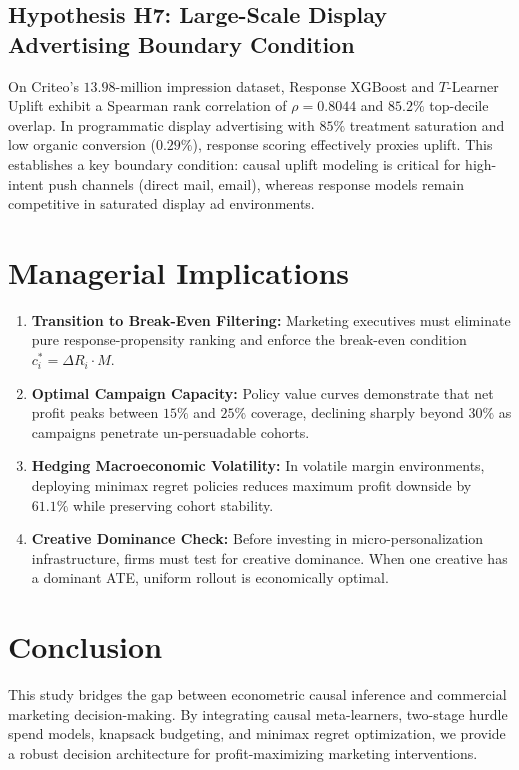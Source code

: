 \documentclass[11pt,a4paper]{article}
\begin{document}
\subsection{Hypothesis H7: Large-Scale Display Advertising Boundary Condition}
On Criteo's $13.98$-million impression dataset, Response XGBoost and $T$-Learner Uplift exhibit a Spearman rank correlation of $\rho = 0.8044$ and $85.2\%$ top-decile overlap. In programmatic display advertising with $85\%$ treatment saturation and low organic conversion ($0.29\%$), response scoring effectively proxies uplift. This establishes a key boundary condition: causal uplift modeling is critical for high-intent push channels (direct mail, email), whereas response models remain competitive in saturated display ad environments.

\section{Managerial Implications}

\begin{enumerate}
    \item \textbf{Transition to Break-Even Filtering:} Marketing executives must eliminate pure response-propensity ranking and enforce the break-even condition $c^*_i = \Delta R_i \cdot M$.
    \item \textbf{Optimal Campaign Capacity:} Policy value curves demonstrate that net profit peaks between $15\%$ and $25\%$ coverage, declining sharply beyond $30\%$ as campaigns penetrate un-persuadable cohorts.
    \item \textbf{Hedging Macroeconomic Volatility:} In volatile margin environments, deploying minimax regret policies reduces maximum profit downside by $61.1\%$ while preserving cohort stability.
    \item \textbf{Creative Dominance Check:} Before investing in micro-personalization infrastructure, firms must test for creative dominance. When one creative has a dominant ATE, uniform rollout is economically optimal.
\end{enumerate}

\section{Conclusion}
This study bridges the gap between econometric causal inference and commercial marketing decision-making. By integrating causal meta-learners, two-stage hurdle spend models, knapsack budgeting, and minimax regret optimization, we provide a robust decision architecture for profit-maximizing marketing interventions.



\end{document}
